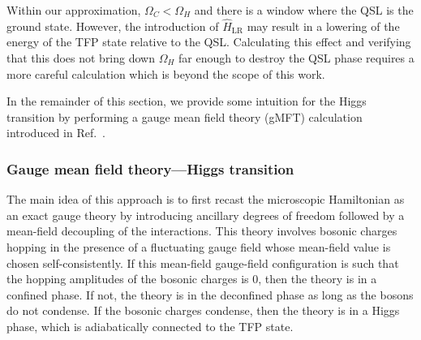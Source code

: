 \documentclass[twocolumn,superscriptaddress,amsmath,amssymb,aps,prx,nofootinbib]{revtex4-2}
\begin{document}
Within our approximation, $\Omega_C<\Omega_H$ and there is a window where the QSL is the ground state. However, the introduction of $\hat{H}_{\text{LR}}$ may result in a lowering of the energy of the TFP state relative to the QSL. Calculating this effect and verifying that this does not bring down $\Omega_H$ far enough to destroy the QSL phase requires a more careful calculation which is beyond the scope of this work.




In the remainder of this section, we provide some intuition for the Higgs transition by performing a gauge mean field theory (gMFT) calculation introduced in Ref.~\cite{savary2012coulombic}. 

\subsubsection{Gauge mean field theory---Higgs transition}\label{sec:gmft}
The main idea of this approach is to first recast the microscopic Hamiltonian as an exact gauge theory by introducing ancillary degrees of freedom followed by a mean-field decoupling of the interactions. This theory involves bosonic charges hopping in the presence of a fluctuating gauge field whose mean-field value is chosen self-consistently. If this mean-field gauge-field configuration is such that the hopping amplitudes of the bosonic charges is 0, then the theory is in a confined phase. If not, the theory is in the deconfined phase as long as the bosons do not condense. If the bosonic charges condense, then the theory is in a Higgs phase, which is adiabatically connected to the TFP state.
\end{document}
